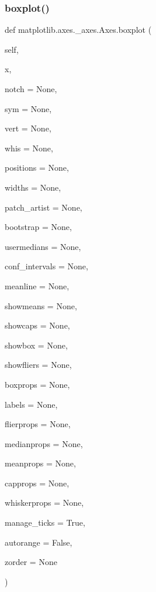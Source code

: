 \subsubsection{\texorpdfstring{boxplot()}{boxplot()}}
{\footnotesize\ttfamily def matplotlib.\+axes.\+\_\+axes.\+Axes.\+boxplot (\begin{DoxyParamCaption}\item[{}]{self,  }\item[{}]{x,  }\item[{}]{notch = {\ttfamily None},  }\item[{}]{sym = {\ttfamily None},  }\item[{}]{vert = {\ttfamily None},  }\item[{}]{whis = {\ttfamily None},  }\item[{}]{positions = {\ttfamily None},  }\item[{}]{widths = {\ttfamily None},  }\item[{}]{patch\+\_\+artist = {\ttfamily None},  }\item[{}]{bootstrap = {\ttfamily None},  }\item[{}]{usermedians = {\ttfamily None},  }\item[{}]{conf\+\_\+intervals = {\ttfamily None},  }\item[{}]{meanline = {\ttfamily None},  }\item[{}]{showmeans = {\ttfamily None},  }\item[{}]{showcaps = {\ttfamily None},  }\item[{}]{showbox = {\ttfamily None},  }\item[{}]{showfliers = {\ttfamily None},  }\item[{}]{boxprops = {\ttfamily None},  }\item[{}]{labels = {\ttfamily None},  }\item[{}]{flierprops = {\ttfamily None},  }\item[{}]{medianprops = {\ttfamily None},  }\item[{}]{meanprops = {\ttfamily None},  }\item[{}]{capprops = {\ttfamily None},  }\item[{}]{whiskerprops = {\ttfamily None},  }\item[{}]{manage\+\_\+ticks = {\ttfamily True},  }\item[{}]{autorange = {\ttfamily False},  }\item[{}]{zorder = {\ttfamily None} }\end{DoxyParamCaption})}

